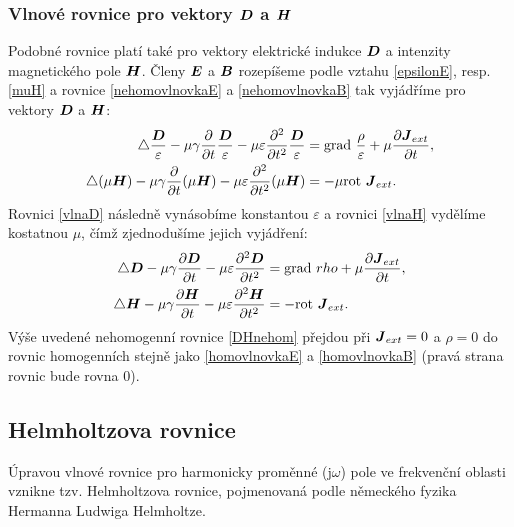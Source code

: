 \documentclass[12pt,a4paper,oneside]{article}
\numberwithin{equation}{section} %
\numberwithin{figure}{section} %
\numberwithin{table}{section} %
\newcommand{\mj}{\mathrm{j}} %
\renewcommand{\vec}[1]{\mbox{\boldmath$#1$}} %
\newcommand{\grad}{\mathrm{grad}\ }
\newcommand{\rot}{\mathrm{rot}\ }
\begin{document}
\subsubsection*{Vlnové rovnice pro vektory $\vec{D}$ a $\vec{H}$}
Podobné rovnice platí také pro vektory elektrické indukce $\vec{D}$ a intenzity magnetického pole $\vec{H}$. Členy $\vec{E}$ a $\vec{B}$ rozepíšeme podle vztahu \ref{epsilonE}, resp. \ref{muH} a rovnice \ref{nehomovlnovkaE} a \ref{nehomovlnovkaB} tak vyjádříme pro vektory $\vec{D}$ a $\vec{H}$:
\begin{subequations}
\begin{align}
\label{vlnaD}
\triangle \frac{\vec{D}}{\varepsilon} - \mu \gamma \frac{\partial}{\partial t} \frac{\vec{D}}{\varepsilon} - \mu \varepsilon \frac{\partial ^2}{\partial t ^2} \frac{\vec{D}}{\varepsilon} &= \grad \frac{\rho}{\varepsilon} + \mu \frac{\partial \vec{J} _{ext}}{\partial t} ,
\\
\label{vlnaH}
\triangle (\mu \vec{H}) - \mu \gamma \frac{\partial}{\partial t} (\mu \vec{H}) - \mu \varepsilon \frac{\partial ^2}{\partial t ^2} (\mu \vec{H}) &= - \mu \rot \vec{J} _{ext}.
\end{align}
\end{subequations}
Rovnici \ref{vlnaD} následně vynásobíme konstantou $\varepsilon$ a rovnici \ref{vlnaH} vydělíme kostatnou $\mu$, čímž zjednodušíme jejich vyjádření:
\begin{subequations}
\label{DHnehom}
\begin{align}
\label{nehomovlnovkaD}
\triangle \vec{D} - \mu \gamma \frac{\partial \vec{D}}{\partial t} - \mu \varepsilon \frac{\partial ^2 \vec{D}}{\partial t ^2} &= \grad rho + \mu \frac{\partial \vec{J} _{ext}}{\partial t} ,
\\
\label{nehomovlnovkaH}
\triangle \vec{H} - \mu \gamma \frac{\partial \vec{H}}{\partial t} - \mu \varepsilon \frac{\partial ^2 \vec{H}}{\partial t ^2} &= - \rot \vec{J} _{ext}.
\end{align}
\end{subequations}
Výše uvedené nehomogenní rovnice \ref{DHnehom} přejdou při $\vec{J} _{ext} = 0$ a $\rho = 0$ do rovnic homogenních stejně jako \ref{homovlnovkaE} a \ref{homovlnovkaB} (pravá strana rovnic bude rovna 0).



\subsection{Helmholtzova rovnice}
Úpravou vlnové rovnice pro harmonicky proměnné ($\mj \omega$) pole ve frekvenční oblasti vznikne tzv. Helmholtzova rovnice, pojmenovaná podle německého fyzika Hermanna Ludwiga Helmholtze.
\end{document}
